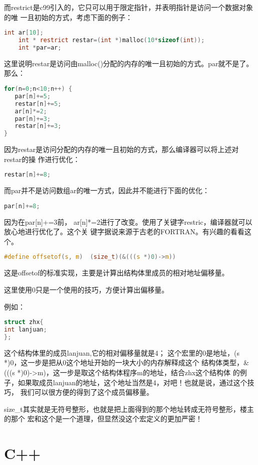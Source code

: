 \documentclass[a4paper,11pt]{book}
\begin{document}
而restrict是c99引入的，它只可以用于限定指针，并表明指针是访问一个数据对象的唯
一且初始的方式，考虑下面的例子：
\begin{lstlisting}[language=c]
    int ar[10];
    int * restrict restar=(int *)malloc(10*sizeof(int));
    int *par=ar;
\end{lstlisting}

这里说明restar是访问由malloc()分配的内存的唯一且初始的方式。par就不是了。
那么：
\begin{lstlisting}[language=c]
for(n=0;n<10;n++) {
   par[n]+=5;
   restar[n]+=5;
   ar[n]*=2;
   par[n]+=3;
   restar[n]+=3;
}
\end{lstlisting}
因为restar是访问分配的内存的唯一且初始的方式，那么编译器可以将上述对restar的操
作进行优化：
\begin{lstlisting}[language=c]
restar[n]+=8;
\end{lstlisting}

而par并不是访问数组ar的唯一方式，因此并不能进行下面的优化：
\begin{lstlisting}[language=c]
   par[n]+=8;
\end{lstlisting}
因为在par[n]+=3前，
ar[n]*=2进行了改变。使用了关键字restric，编译器就可以放心地进行优化了。这个关
键字据说来源于古老的FORTRAN。有兴趣的看看这个。
\begin{lstlisting}[language=c]
#define offsetof(s, m)  (size_t)(&(((s *)0)->m))
\end{lstlisting}

这是offsetof的标准实现，主要是计算出结构体里成员的相对地址偏移量。

这里使用0只是一个使用的技巧，方便计算出偏移量。

例如：
\begin{lstlisting}[language=c]
struct zhx{
int lanjuan;
};
\end{lstlisting}
这个结构体里的成员lanjuan,它的相对偏移量就是4；
这个宏里的0是地址，(s *)0，这一步是把从0这个地址开始的一块大小的内存解释成这个
结构体类型，\&(((s *)0)->m)，这一步是取这个结构体程序m的地址，结合zhx这个结构体
的例子，如果取成员lanjuan的地址，这个地址当然是4，对吧！也就是说，通过这个技巧，
我们可以很方便的得到了这个成员偏移量。

size_t其实就是无符号整形，也就是把上面得到的那个地址转成无符号整形，楼主的那个
宏和这个是一个道理，但显然没这个宏定义的更加严密！

\chapter{C++}
\end{document}
